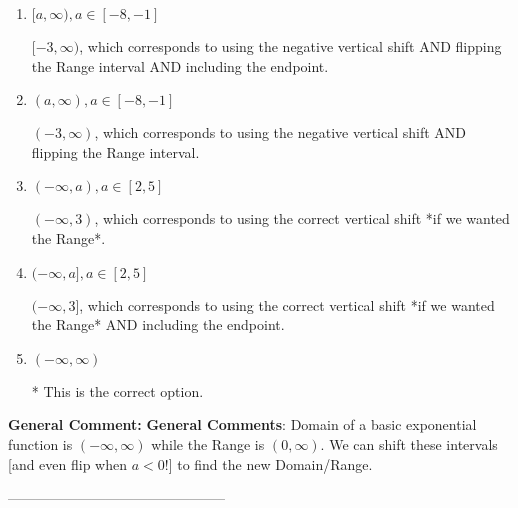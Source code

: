 \documentclass{extbook}[14pt]
\begin{document}
\begin{enumerate}[label=\Alph*.] 
\item $ [a, \infty), a \in [-8, -1] $ 

 $[-3, \infty)$, which corresponds to using the negative vertical shift AND flipping the Range interval AND including the endpoint. 
\item $ (a, \infty), a \in [-8, -1] $ 

 $(-3, \infty)$, which corresponds to using the negative vertical shift AND flipping the Range interval. 
\item $ (-\infty, a), a \in [2, 5] $ 

 $(-\infty, 3)$, which corresponds to using the correct vertical shift *if we wanted the Range*. 
\item $ (-\infty, a], a \in [2, 5] $ 

 $(-\infty, 3]$, which corresponds to using the correct vertical shift *if we wanted the Range* AND including the endpoint. 
\item $ (-\infty, \infty) $ 

 * This is the correct option. 
\end{enumerate} 
 
\textbf{General Comment:} \textbf{General Comments}: Domain of a basic exponential function is $(-\infty, \infty)$ while the Range is $(0, \infty)$. We can shift these intervals [and even flip when $a<0$!] to find the new Domain/Range. 

-----------------------------------------------
\end{document}
